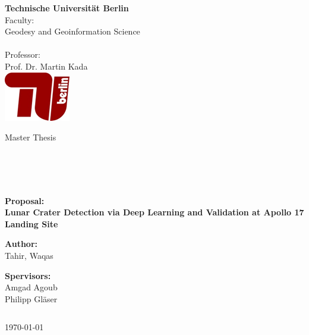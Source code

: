 \documentclass[11pt]{article}
\begin{document}
\begin{titlepage}
	\begin{multicols}{2} 
		\textbf {Technische Universit\"{a}t Berlin}\\
		Faculty:            \\ Geodesy and Geoinformation Science\\  \\
		Professor: \\
		Prof. Dr. Martin Kada\\
		\columnbreak
		\flushright
		\includegraphics{files/TU} 
	\end{multicols}

	\vspace{0.1\textheight}
	
	\begin{center}
		Master Thesis
	\end{center}
	
	\begin{verbatim}
 
 
 
	\end{verbatim}
	\begin{center}
		\textbf{\Large{Proposal: \\[1 cm] Lunar Crater Detection via Deep Learning and Validation at Apollo 17 Landing Site}}
	\end{center}
	\vspace{0.25\textheight}
	\begin{center}
		\vspace{0.7cm}
		\textbf{Author:}\\
		Tahir, Waqas \\
	\end{center}
	\begin{center}	
		\textbf{Spervisors:}\\
		Amgad Agoub\\
		Philipp Gläser
	\end{center}
	\begin{verbatim}
	\end{verbatim}
	\begin{center}
		\today
	\end{center}

\end{titlepage}
\end{document}
